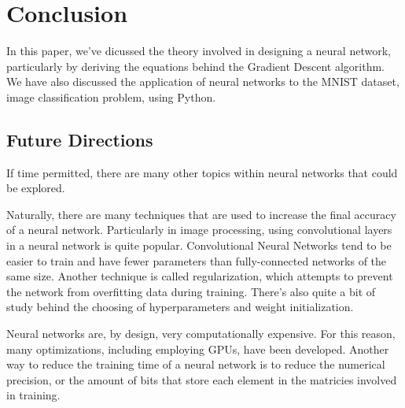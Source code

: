 \newpage
\section{Conclusion}

In this paper, we've dicussed the theory involved in designing a neural
network, particularly by deriving the equations behind the Gradient Descent
algorithm.
We have also discussed the application of neural networks to the MNIST
dataset, image classification problem, using Python.


\subsection{Future Directions}
If time permitted, there are many other topics within neural networks that
could be explored.

Naturally, there are many techniques that are used to increase the final accuracy
of a neural network. Particularly in image processing, using convolutional
layers in a neural network is quite popular. Convolutional Neural Networks tend
to be easier to train and have fewer parameters than fully-connected networks
of the same size. 
Another technique is called regularization, which attempts to prevent
the network from overfitting data during training.
There's also quite a bit of study behind the choosing of hyperparameters and
weight initialization.

Neural networks are, by design, very computationally expensive. For this
reason, many optimizations, including employing GPUs, have been developed.
Another way to reduce the training time of a neural network is to reduce the
numerical precision, or the amount of bits that store each element in the
matricies involved in training.
